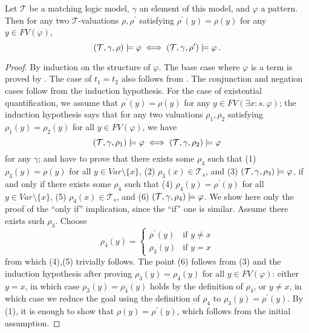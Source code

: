 \begin{lemma}\label{lem:unusedVariables}
    Let $\mathcal{T}$ be a matching logic model, $\gamma$ an element of this model,
    and $\varphi$ a pattern.
    Then for any two $\mathcal{T}$-valuations $\rho,\rho^\prime$
    satisfying $\rho^\prime(y) = \rho(y)$ for any $y \in \mathit{FV}(\varphi)$,
    \begin{equation*}
        (\mathcal{T}, \gamma, \rho) \models \varphi \iff (\mathcal{T}, \gamma, \rho^\prime) \models \varphi \, .
    \end{equation*}
\end{lemma}
\begin{proof}
    By induction on the structure of $\varphi$.
    The base case where $\varphi$ is a term is proved by .
    The case of $t_1 = t_2$ also follows from .
    The conjunction and negation cases follow from the induction hypothesis.
    For the case of existential quantification,
    we assume that $\rho^\prime(y) = \rho(y)$ for any $y \in \mathit{FV}(\exists x : s.\, \varphi)$;
    the induction hypothesis says that for any two valuations $\rho_1,\rho_2$ satisfying $\rho_1(y) = \rho_2(y)$
    for all $y \in \mathit{FV}(\varphi)$, we have
    \begin{equation*}
        (\mathcal{T}, \gamma, \rho_1) \models \varphi \iff (\mathcal{T}, \gamma, \rho_2) \models \varphi
    \end{equation*}
    for any $\gamma$;
    and have to prove that
        there exists some $\rho_3$ such that (1) $\rho_3(y) = \rho(y)$ for all $y \in \mathit{Var} \setminus \{ x \}$,
        (2) $\rho_3(x) \in \mathcal{T}_s$, and (3) $(\mathcal{T}, \gamma, \rho_3) \models \varphi$,
        if and only if
        there exists some $\rho_4$ such that (4) $\rho_4(y) = \rho^\prime(y)$ for all $y \in \mathit{Var} \setminus \{ x \}$,
        (5) $\rho_4(x) \in \mathcal{T}_s$, and (6) $(\mathcal{T}, \gamma, \rho_4) \models \varphi$.
    We show here only the proof of the ``only if'' implication, since the ``if'' one is similar.
    Assume there exists such $\rho_3$.
    Choose
    \begin{equation*}
        \rho_4(y)=
            \begin{cases}
                \rho^\prime(y) & \text{if } y \not = x \\
                \rho_3(y) & \text{if } y = x
            \end{cases}
    \end{equation*}
    from which (4),(5) trivially follows. The point (6) follows from (3) and the induction hypothesis
    after proving $\rho_3(y) = \rho_4(y)$ for all $y \in \mathit{FV}(\varphi)$:
    either $y = x$, in which case $\rho_3(y) = \rho_4(y)$ holds by the definition of $\rho_4$,
    or $y \not = x$, in which case we reduce the goal using the definition of $\rho_4$
    to $\rho_3(y) = \rho^\prime(y)$. By (1), it is enough to show that $\rho(y) = \rho^\prime(y)$,
    which follows from the initial assumption.
\end{proof}


